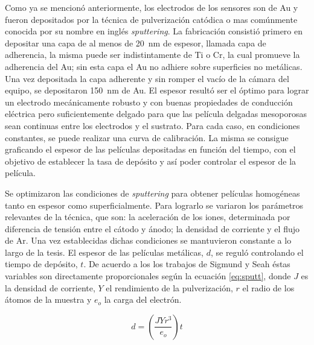		 Como ya se mencionó anteriormente, los electrodos de los sensores son de Au y fueron depositados por la técnica de pulverización catódica o mas comúnmente conocida por su nombre en inglés \textit{sputtering}. La fabricación consistió primero en depositar una capa de al menos de \SI{20}{\nm} de espesor, llamada capa de  adherencia, la misma puede ser indistintamente de Ti o Cr, la cual promueve la adherencia del Au; sin esta capa el Au no adhiere sobre superficies no metálicas.\cite{Hieber1976} Una vez depositada la capa adherente y sin romper el vacío de la cámara del equipo, se depositaron \SI{150}{nm} de Au. El espesor resultó ser el óptimo para lograr un electrodo mecánicamente robusto y con buenas propiedades de conducción eléctrica pero suficientemente delgado para que las película delgadas mesoporosas sean continuas entre los electrodos y el sustrato. Para cada caso, en condiciones constantes, se puede realizar una curva de calibración. La misma se consigue graficando el espesor de las películas depositadas en función del tiempo, con el objetivo de establecer la tasa de depósito y así poder controlar el espesor de la película. 

		 Se optimizaron las condiciones de \textit{sputtering} para obtener películas homogéneas tanto en espesor como superficialmente. Para lograrlo se variaron los parámetros relevantes de la técnica, que son: la aceleración de los iones, determinada por diferencia de tensión entre el cátodo y ánodo; la densidad de corriente y el flujo de Ar. Una vez establecidas dichas condiciones se mantuvieron constante a lo largo de la tesis. El espesor de las películas metálicas, $d$, se reguló controlando el tiempo de depósito, $t$. De acuerdo a los los trabajos de Sigmund\cite{sigmund1968} y Seah\cite{Seah2005} éstas variables son directamente proporcionales según la ecuación \ref{eq:sputt}, donde $J$ es la densidad de corriente, $Y$ el rendimiento de la pulverización, $r$ el radio de los átomos de la muestra y $e_o$ la carga del electrón.

	 			\begin{equation}
	 				d=\left(\frac{JYr^3}{e_o}\right)t
	 				\label{eq:sputt}
	 			\end{equation}


